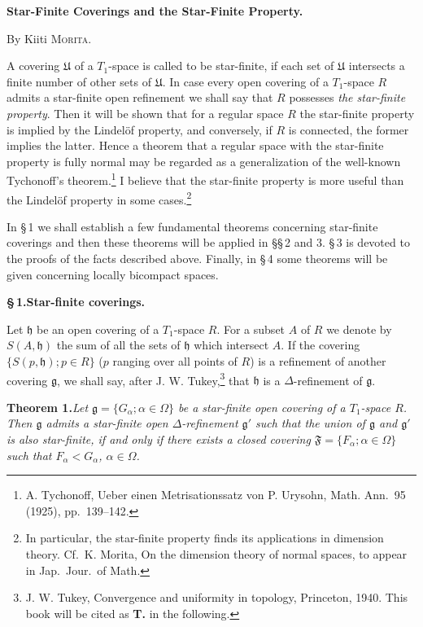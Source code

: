\documentclass[11pt,a4paper,leqno]{article}
\newcommand{\g}{\mathfrak g}
\newcommand{\f}{\mathfrak F}
\newcommand{\thm}[2]{\par\medskip\textbf{Theorem #1.}\quad\textit{#2}\par}
\renewcommand{\thefootnote}{\arabic{footnote})}
\newcommand{\sect}[2]{\par\medskip\begin{center}\bfseries\S\,#1.\quad #2\end{center}}
\begin{document}
\setcounter{page}{60}
\begin{center}
{\Large\bfseries Star-Finite Coverings and the Star-Finite Property.}\par\bigskip
By Kiiti \textsc{Morita}.
\end{center}
\begingroup\renewcommand{\thefootnote}{}\endgroup
A covering $\mathfrak U$ of a $T_1$-space is called to be star-finite, if each set of $\mathfrak U$ intersects a finite number of other sets of $\mathfrak U$. In case every open covering of a $T_1$-space $R$ admits a star-finite open refinement we shall say that $R$ possesses \textit{the star-finite property}. Then it will be shown that for a regular space $R$ the star-finite property is implied by the Lindelöf property, and conversely, if $R$ is connected, the former implies the latter. Hence a theorem that a regular space with the star-finite property is fully normal may be regarded as a generalization of the well-known Tychonoff's theorem.\footnote{A. Tychonoff, Ueber einen Metrisationssatz von P. Urysohn, Math. Ann.\ 95 (1925), pp.\ 139--142.} I believe that the star-finite property is more useful than the Lindelöf property in some cases.\footnote{In particular, the star-finite property finds its applications in dimension theory. Cf.\ K. Morita, On the dimension theory of normal spaces, to appear in Jap.\ Jour.\ of Math.}

In \S\,1 we shall establish a few fundamental theorems concerning star-finite coverings and then these theorems will be applied in \S\S\,2 and 3. \S\,3 is devoted to the proofs of the facts described above. Finally, in \S\,4 some theorems will be given concerning locally bicompact spaces.

\sect{1}{Star-finite coverings.}
Let $\mathfrak h$ be an open covering of a $T_1$-space $R$. For a subset $A$ of $R$ we denote by $S(A,\mathfrak h)$ the sum of all the sets of $\mathfrak h$ which intersect $A$. If the covering $\{S(p,\mathfrak h);p\in R\}$ ($p$ ranging over all points of $R$) is a refinement of another covering $\g$, we shall say, after J. W. Tukey,\footnote{J. W. Tukey, Convergence and uniformity in topology, Princeton, 1940. This book will be cited as \textbf{T.} in the following.} that $\mathfrak h$ is a $\Delta$-refinement of $\g$.

\thm{1}{Let $\g=\{G_\alpha;\alpha\in\Omega\}$ be a star-finite open covering of a $T_1$-space $R$. Then $\g$ admits a star-finite open $\Delta$-refinement $\g'$ such that the union of $\g$ and $\g'$ is also star-finite, if and only if there exists a closed covering $\f=\{F_\alpha;\alpha\in\Omega\}$ such that $F_\alpha<G_\alpha$, $\alpha\in\Omega$.}
\end{document}
